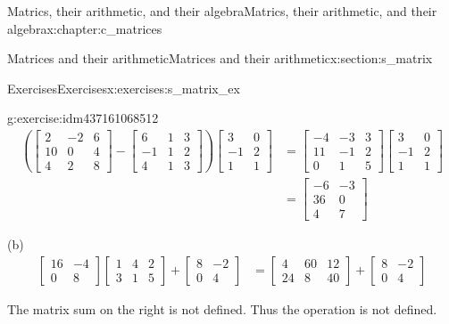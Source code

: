 \documentclass[oneside,10pt,]{book}
\numberwithin{equation}{section}
\newcommand{\amp}{&}
\begin{document}
\begin{chapterptx}{Matrics, their arithmetic, and their algebra}{}{Matrics, their arithmetic, and their algebra}{}{}{x:chapter:c_matrices}
\begin{sectionptx}{Matrices and their arithmetic}{}{Matrices and their arithmetic}{}{}{x:section:s_matrix}
\begin{exercises-subsection-numberless}{Exercises}{}{Exercises}{}{}{x:exercises:s_matrix_ex}
\begin{divisionexercise}{2}{}{}{g:exercise:idm437161068512}
\begin{align*}
\left(\begin{bmatrix}2\amp -2\amp 6\\ 10\amp 0\amp 4\\ 4\amp 2\amp 8 \end{bmatrix} - \begin{bmatrix}6\amp 1\amp 3\\ -1\amp 1\amp 2\\ 4\amp 1\amp 3 \end{bmatrix} \right) \begin{bmatrix}3\amp 0\\ -1\amp 2\\ 1\amp 1 \end{bmatrix} \amp =\begin{bmatrix}-4\amp -3\amp 3\\ 11\amp -1\amp 2\\ 0\amp 1\amp 5 \end{bmatrix} \begin{bmatrix}3\amp 0\\ -1\amp 2\\ 1\amp 1 \end{bmatrix}\\
\amp =\begin{bmatrix}-6\amp -3\\ 36\amp 0\\ 4\amp 7 \end{bmatrix}
\end{align*}
%
\par
(b)%
\begin{align*}
\begin{bmatrix}16\amp -4\\ 0\amp 8 \end{bmatrix} \begin{bmatrix}1\amp 4\amp 2\\ 3\amp 1\amp 5 \end{bmatrix} + \begin{bmatrix}8\amp -2\\ 0\amp 4 \end{bmatrix} \amp = \begin{bmatrix}4\amp 60\amp 12\\ 24\amp 8\amp 40 \end{bmatrix} + \begin{bmatrix}8\amp -2\\ 0\amp 4 \end{bmatrix}
\end{align*}
%
\par
The matrix sum on the right is not defined. Thus the operation is not defined.%

\end{divisionexercise}
\end{exercises-subsection-numberless}
\end{sectionptx}
\end{chapterptx}
\end{document}
